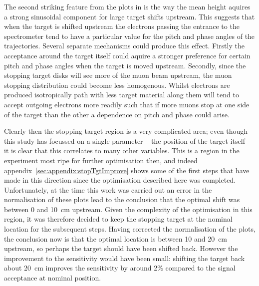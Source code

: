 The second striking feature from the plots in  is the way the mean height aquires a strong sinusoidal component for large target shifts upstream.
This suggests that when the target is shifted upstream the electrons passing the entrance to the spectrometer tend to have a particular value for the pitch and phase angles of the trajectories.
Several separate mechanisms could produce this effect.
Firstly the acceptance around the target itself could aquire a stronger preference for certain pitch and phase angles when the target is moved upstream.
Secondly, since the stopping target disks will see more of the muon beam upstream, the muon stopping distribution could become less homogenous.  Whilst electrons are produced isotropically path with less target material along them will tend to accept outgoing electrons more readily such that if more muons stop at one side of the target than the other a dependence on pitch and phase could arise.

Clearly then the stopping target region is a very complicated area; even though this study has focussed on a single parameter -- the position of the target itself -- it is clear that this correlates to many other variables.
This is a region in the experiment most ripe for further optimisation then, and indeed appendix~\ref{sec:appendix:stopTgtImprove} shows some of the first steps that have made in this direction since the optimisation described here was completed.
Unfortunately, at the time this work was carried out an error in the normalisation of these plots lead to the conclusion that the optimal shift was between 0 and 10~cm upstream.
Given the complexity of the optimisation in this region, it was therefore decided to keep the stopping target at the nominal location for the subsequent steps.
Having corrected the normalisation of the plots, the conclusion now is that the optimal location is between 10 and 20~cm upstream, so perhaps the target should have been shifted back.
However the improvement to the sensitivity would have been small: shifting the target back about 20~cm improves the sensitivity by around 2\% compared to the signal acceptance at nominal position.

